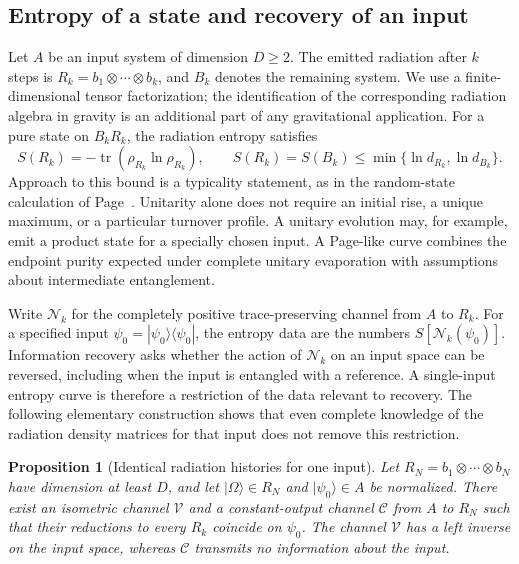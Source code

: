 \documentclass[11pt,letterpaper]{article}
\theoremstyle{plain}
\newtheorem{proposition}[theorem]{Proposition}
\theoremstyle{definition}
\theoremstyle{remark}
\newcommand{\Ccal}{\mathcal{C}}
\newcommand{\Ncal}{\mathcal{N}}
\newcommand{\Vcal}{\mathcal{V}}
\DeclareMathOperator{\tr}{tr}
\begin{document}
\subsection{Entropy of a state and recovery of an input}
\label{subsec02:page_curve_meaning}

Let $A$ be an input system of dimension $D\geq2$. The emitted radiation
after $k$ steps is $R_k=b_1\otimes\cdots\otimes b_k$, and $B_k$ denotes
the remaining system. We use a finite-dimensional tensor factorization;
the identification of the corresponding radiation algebra in gravity is
an additional part of any gravitational application. For a pure state on
$B_kR_k$, the radiation entropy satisfies
\begin{equation}
 S(R_k)=-\tr(\rho_{R_k}\ln\rho_{R_k}),\qquad
 S(R_k)=S(B_k)\leq\min\{\ln d_{R_k},\ln d_{B_k}\}.
 \label{eq02:entropy_bound}
\end{equation}
Approach to this bound is a typicality statement, as in the random-state
calculation of Page~\citep{page1993}. Unitarity alone does not require an
initial rise, a unique maximum, or a particular turnover profile. A
unitary evolution may, for example, emit a product state for a specially
chosen input. A Page-like curve combines the endpoint purity expected
under complete unitary evaporation with assumptions about intermediate
entanglement.

Write $\Ncal_k$ for the completely positive trace-preserving channel from
$A$ to $R_k$. For a specified input $\psi_0=|\psi_0\rangle\langle\psi_0|$,
the entropy data are the numbers $S[\Ncal_k(\psi_0)]$. Information
recovery asks whether the action of $\Ncal_k$ on an input space can be
reversed, including when the input is entangled with a reference. A
single-input entropy curve is therefore a restriction of the data
relevant to recovery. The following elementary construction shows that
even complete knowledge of the radiation density matrices for that
input does not remove this restriction.

\begin{proposition}[Identical radiation histories for one input]
\label{prop02:channel_counterexample}
Let $R_N=b_1\otimes\cdots\otimes b_N$ have dimension at least $D$, and
let $|\Omega\rangle\in R_N$ and $|\psi_0\rangle\in A$ be normalized.
There exist an isometric channel $\Vcal$ and a constant-output channel
$\Ccal$ from $A$ to $R_N$ such that their reductions to every $R_k$
coincide on $\psi_0$. The channel $\Vcal$ has a left inverse on the
input space, whereas $\Ccal$ transmits no information about the input.
\end{proposition}
\end{document}
